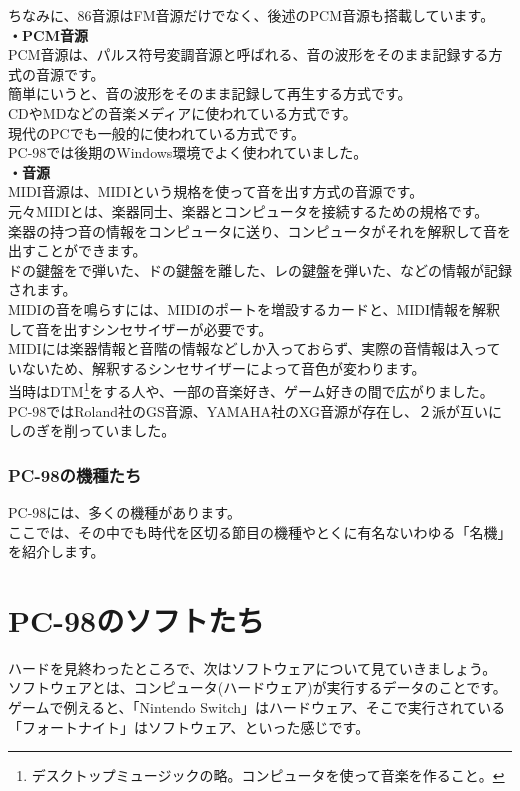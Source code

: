 \documentclass[b5paper,9pt,platex,dvipdfmx]{jsarticle}
\begin{document}
\begin{multicols}{3}
\begin{enumerate}
  ちなみに、86音源はFM音源だけでなく、後述のPCM音源も搭載しています。\\
  {\bf ・PCM音源 \\}
  PCM音源は、パルス符号変調音源と呼ばれる、音の波形をそのまま記録する方式の音源です。\\
  簡単にいうと、音の波形をそのまま記録して再生する方式です。\\
  CDやMDなどの音楽メディアに使われている方式です。\\
  現代のPCでも一般的に使われている方式です。\\
  PC-98では後期のWindows環境でよく使われていました。\\
  {\bf ・音源 \\}
  MIDI音源は、MIDIという規格を使って音を出す方式の音源です。\\
  元々MIDIとは、楽器同士、楽器とコンピュータを接続するための規格です。\\
  楽器の持つ音の情報をコンピュータに送り、コンピュータがそれを解釈して音を出すことができます。\\
  ドの鍵盤をで弾いた、ドの鍵盤を離した、レの鍵盤を弾いた、などの情報が記録されます。\\
  MIDIの音を鳴らすには、MIDIのポートを増設するカードと、MIDI情報を解釈して音を出すシンセサイザーが必要です。\\
  MIDIには楽器情報と音階の情報などしか入っておらず、実際の音情報は入っていないため、解釈するシンセサイザーによって音色が変わります。\\
  当時はDTM\footnote{デスクトップミュージックの略。コンピュータを使って音楽を作ること。}をする人や、一部の音楽好き、ゲーム好きの間で広がりました。\\
  PC-98ではRoland社のGS音源、YAMAHA社のXG音源が存在し、２派が互いにしのぎを削っていました。\\
\end{enumerate}
\section[short]{PC-98の機種たち}
PC-98には、多くの機種があります。\\
ここでは、その中でも時代を区切る節目の機種やとくに有名ないわゆる「名機」を紹介します。\\
\part{PC-98のソフトたち}
\setcounter{section}{0}
ハードを見終わったところで、次はソフトウェアについて見ていきましょう。\\
ソフトウェアとは、コンピュータ(ハードウェア)が実行するデータのことです。\\
ゲームで例えると、「Nintendo Switch」はハードウェア、そこで実行されている「フォートナイト」はソフトウェア、といった感じです。

\end{multicols}
\end{document}
